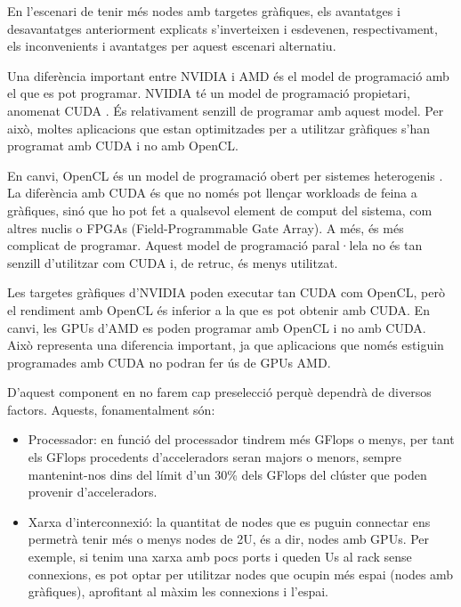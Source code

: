 En l'escenari de tenir més nodes amb targetes gràfiques, els avantatges i desavantatges anteriorment explicats s'inverteixen i esdevenen, respectivament, els inconvenients i avantatges per aquest escenari alternatiu.

Una diferència important entre NVIDIA i AMD és el model de programació amb el que es pot programar. NVIDIA té un model de programació propietari, anomenat CUDA \cite{gpu_cuda}. És relativament senzill de programar amb aquest model. Per això, moltes aplicacions que estan optimitzades per a utilitzar gràfiques s'han programat amb CUDA i no amb OpenCL.

En canvi, OpenCL és un model de programació obert per sistemes heterogenis \cite{gpu_opencl}. La diferència amb CUDA és que no només pot llençar workloads de feina a gràfiques, sinó que ho pot fet a qualsevol element de comput del sistema, com altres nuclis o FPGAs (Field-Programmable Gate Array). A més, és més complicat de programar. %
Aquest model de programació paral·lela no és tan senzill d'utilitzar com CUDA i, de retruc, és menys utilitzat.

Les targetes gràfiques d'NVIDIA poden executar tan CUDA com OpenCL, però el rendiment amb OpenCL és inferior a la que es pot obtenir amb CUDA. En canvi, les GPUs d'AMD es poden programar amb OpenCL i no amb CUDA. 
Això representa una diferencia important, ja que aplicacions que només estiguin programades amb CUDA no podran fer ús de GPUs AMD.

D'aquest component en no farem cap preselecció perquè dependrà de diversos factors. Aquests, fonamentalment són: 
\begin{itemize}
    \item Processador: en funció del processador tindrem més GFlops o menys, per tant els GFlops procedents d'acceleradors seran majors o menors, sempre mantenint-nos dins del límit d'un 30\% dels GFlops del clúster que poden provenir d'acceleradors.
    \item Xarxa d'interconnexió: la quantitat de nodes que es puguin connectar ens permetrà tenir més o menys nodes de 2U, és a dir, nodes amb GPUs. Per exemple, si tenim una xarxa amb pocs ports i queden Us al rack sense connexions, es pot optar per utilitzar nodes que ocupin més espai (nodes amb gràfiques), aprofitant al màxim les connexions i l'espai.
\end{itemize}


